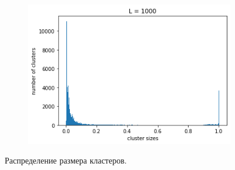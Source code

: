 \begin{figure}[H]
\begin{subfigure}[t]{0.3\textwidth}
		\includegraphics[width=\textwidth]{../images/cluster_sizes_L1000.png} 
	\end{subfigure}
	\caption{Распределение размера кластеров.}
\end{figure}

